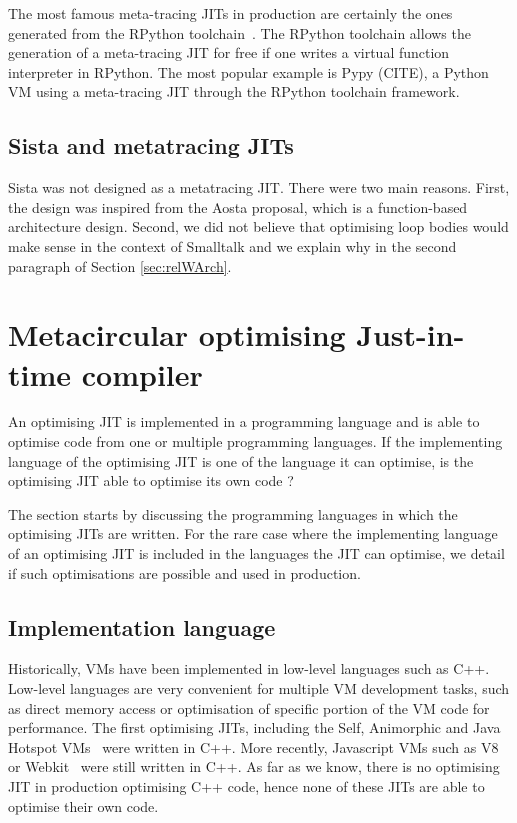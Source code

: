 \documentclass[a4paper,12pt,twoside]{../includes/ThesisStyle}
\begin{document}
The most famous meta-tracing JITs in production are certainly the ones generated from the RPython toolchain~\cite{Rigo06a}. The RPython toolchain allows the generation of a meta-tracing JIT for free if one writes a virtual function interpreter in RPython. The most popular example is Pypy (CITE), a Python VM using a meta-tracing JIT through the RPython toolchain framework.

\subsection{Sista and metatracing JITs}

Sista was not designed as a metatracing JIT. There were two main reasons. First, the design was inspired from the Aosta proposal, which is a function-based architecture design. Second, we did not believe that optimising loop bodies would make sense in the context of Smalltalk and we explain why in the second paragraph of Section \ref{sec:relWArch}.


\section{Metacircular optimising Just-in-time compiler}
\label{sec:implLang}

An optimising JIT is implemented in a programming language and is able to optimise code from one or multiple programming languages. If the implementing language of the optimising JIT is one of the language it can optimise, is the optimising JIT able to optimise its own code ?

The section starts by discussing the programming languages in which the optimising JITs are written. For the rare case where the implementing language of an optimising JIT is included in the languages the JIT can optimise, we detail if such optimisations are possible and used in production.

\subsection{Implementation language}
Historically, VMs have been implemented in low-level languages such as C++. Low-level languages are very convenient for multiple VM development tasks, such as direct memory access or optimisation of specific portion of the VM code for performance. The first optimising JITs, including the Self, Animorphic and Java Hotspot VMs~\cite{UrsPHD,Sun06} were written in C++. More recently, Javascript VMs such as V8 or Webkit~\cite{Webkit15} were still written in C++. As far as we know, there is no optimising JIT in production optimising C++ code, hence none of these JITs are able to optimise their own code.
\end{document}
